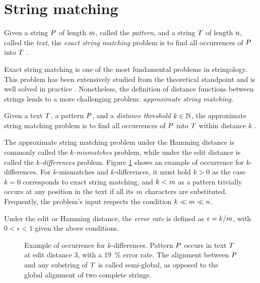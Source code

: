 
\section{String matching}

\begin{definition}
Given a string $P$ of length $m$, called the \emph{pattern}, and a string $T$ of length $n$, called the \emph{text}, the \emph{exact string matching} problem is to find all occurrences of $P$ into $T$ \citep{Gusfield1997}.
\end{definition}

Exact string matching is one of the most fundamental problems in stringology.
This problem has been extensively studied from the theoretical standpoint and is well solved in practice \citep{Faro2013}.
Nonetheless, the definition of distance functions between strings lends to a more challenging problem: \emph{approximate string matching}.

\begin{definition}
Given a text $T$, a pattern $P$, and a \emph{distance threshold} $k \in \mathbb {N}$, the approximate string matching problem is to find all occurrences of $P$ into $T$ within distance $k$ \citep{Galil1988}.
\end{definition}

The approximate string matching problem under the Hamming distance is commonly called the \emph{$k$-mismatches} problem, while under the edit distance is called the \emph{$k$-differences} problem.
Figure \ref{fig:edit-occurrence} shows an example of occurrence for $k$-differences.
For $k$-mismatches and $k$-differences, it must hold $k > 0$ as the case $k = 0$ corresponds to exact string matching, and $k < m$ as a pattern trivially occurs at any position in the text if all its $m$ characters are substituted.
Frequently, the problem's input respects the condition $k \ll m \ll n$.
\begin{definition}
Under the edit or Hamming distance, the \emph{error rate} is defined as $\epsilon = k/m$, with $0 < \epsilon < 1$ given the above conditions.
\end{definition}

\begin{figure}[t]
\begin{center}
\caption[Example of occurrence for $k$-differences]{Example of occurrence for $k$-differences. Pattern $P$ occurs in text $T$ at edit distance 3, \ie with a 19~\% error rate.
The alignment between $P$ and any substring of $T$ is called semi-global, as opposed to the global alignment of two complete strings.
}
\label{fig:edit-occurrence}

\end{center}
\end{figure}

